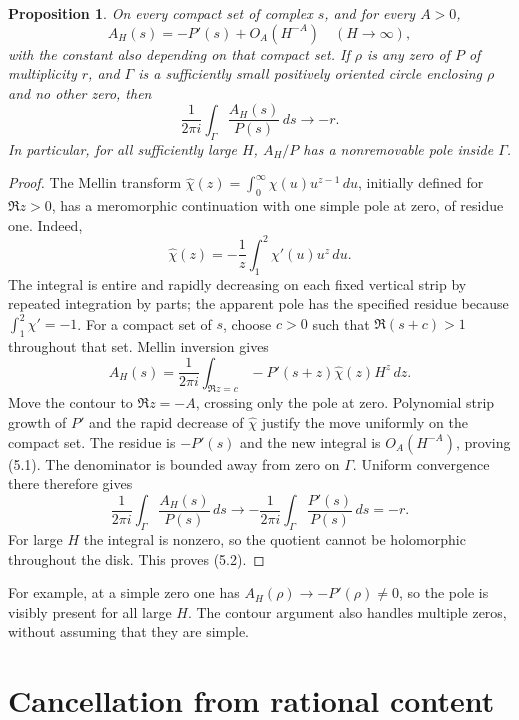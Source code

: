 \documentclass[11pt]{article}
\newtheorem{proposition}[theorem]{Proposition}
\begin{document}
\begin{proposition}\label{prop:poles}
On every compact set of complex $s$, and for every $A>0$,
\[
 A_H(s)=-P'(s)+O_A(H^{-A}) \quad (H\longrightarrow\infty),
                                                               \tag{5.1}
\]
with the constant also depending on that compact set.
If $\rho$ is any zero of $P$ of multiplicity $r$, and $\Gamma$
is a sufficiently small positively oriented circle enclosing
$\rho$ and no other zero, then
\[
 \frac1{2\pi i}\int_\Gamma\frac{A_H(s)}{P(s)}\,ds
       \longrightarrow -r.                                  \tag{5.2}
\]
In particular, for all sufficiently large $H$,
$A_H/P$ has a nonremovable pole inside $\Gamma$.
\end{proposition}
\begin{proof}
The Mellin transform
$\widehat\chi(z)=\int_0^\infty\chi(u)u^{z-1}\,du$, initially
defined for $\Re z>0$, has a meromorphic continuation with
one simple pole at zero, of residue one. Indeed,
\[
 \widehat\chi(z)=-\frac1z\int_1^2\chi'(u)u^z\,du.
\]
The integral is entire and rapidly decreasing on each fixed
vertical strip by repeated integration by parts; the apparent
pole has the specified residue because $\int_1^2\chi'=-1$.
For a compact set of $s$, choose $c>0$ such that
$\Re(s+c)>1$ throughout that set. Mellin inversion gives
\[
 A_H(s)=\frac1{2\pi i}\int_{\Re z=c}
             -P'(s+z)\widehat\chi(z)H^z\,dz.
\]
Move the contour to $\Re z=-A$, crossing only the pole at zero.
Polynomial strip growth of $P'$ and the rapid decrease of
$\widehat\chi$ justify the move uniformly on the compact set.
The residue is $-P'(s)$ and the new integral is $O_A(H^{-A})$,
proving (5.1). The denominator is bounded away from zero on
$\Gamma$. Uniform convergence there therefore gives
\[
 \frac1{2\pi i}\int_\Gamma\frac{A_H(s)}{P(s)}\,ds
 \longrightarrow
 -\frac1{2\pi i}\int_\Gamma\frac{P'(s)}{P(s)}\,ds=-r.
\]
For large $H$ the integral is nonzero, so the quotient cannot
be holomorphic throughout the disk. This proves (5.2).
\end{proof}

For example, at a simple zero one has
$A_H(\rho)\to-P'(\rho)\ne0$, so the pole is visibly present
for all large $H$. The contour argument also handles multiple
zeros, without assuming that they are simple.

\section{Cancellation from rational content}\label{sec:content}
\end{document}

